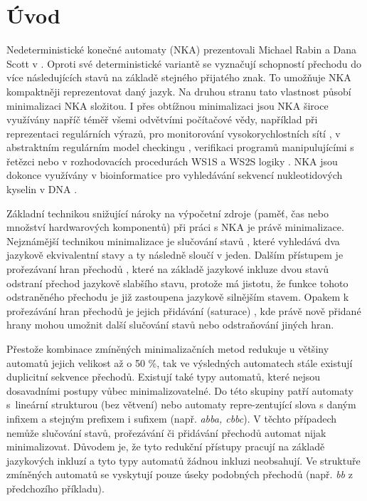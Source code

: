 \section{Úvod}
    Nedeterministické konečné automaty (NKA) prezentovali Michael Rabin a Dana Scott v \cite{FA_and_Their_Decisin_Problems}. Oproti své deterministické variantě se vyznačují schopností přechodu do více následujících stavů na základě stejného přijatého znak. To umožňuje NKA kompaktněji reprezentovat daný jazyk. Na druhou stranu tato vlastnost působí minimalizaci NKA složitou. I přes obtížnou minimalizaci jsou NKA široce využívány napříč téměř všemi odvětvími počítačové vědy, například při reprezentaci regulárních výrazů, pro monitorování vysokorychlostních sítí \cite{FPGA_based_network_scaning}, v abstraktním regulárním model checkingu \cite{ARMC}, verifikaci programů manipulujícími s řetězci \cite{String_constraints_for_ver} nebo v rozhodovacích procedurách WS1S a WS2S logiky \cite{On_equivalence_checking, Nested_antichains_for_WS1S}. NKA jsou dokonce využívány v bioinformatice pro vyhledávání sekvencí nukleotidových kyselin v DNA \cite{DNA_pattern_analysis_using_FA}.

    Základní technikou snižující nároky na výpočetní zdroje (paměť, čas nebo množství hardwarových komponentů) při práci s NKA je právě minimalizace. Nejznámější technikou minimalizace je slučování stavů \cite{Oldest_Merge,Simulation_based_minimization,On_nfa_reduction}, které vyhledává dva jazykově ekvivalentní stavy a ty následně sloučí v jeden. Dalším přístupem je prořezávaní hran přechodů \cite{Simulation_based_minimization, Lorenzo_prunning_saturation}, které na základě jazykové inkluze dvou stavů odstraní přechod jazykově slabšího stavu, protože má jistotu, že funkce tohoto odstraněného přechodu je již zastoupena jazykově silnějším stavem. Opakem k prořezávání hran přechodů je jejich přidávání (saturace) \cite{Oldest_Merge, Lorenzo_prunning_saturation}, kde právě nově přidané hrany mohou umožnit další slučování stavů nebo odstraňování jiných hran.

    Přestože kombinace zmíněných minimalizačních metod redukuje u většiny automatů jejich velikost až o 50 \%, tak ve výsledných automatech stále existují duplicitní sekvence přechodů. Existují také typy automatů, které nejsou dosavadními postupy vůbec minimalizovatelné. Do této skupiny patří automaty s~lineární strukturou (bez větvení) nebo automaty repre-zentující slova s daným infixem a stejným prefixem i sufixem (např. \textit{abba, cbbc}). V těchto případech nemůže slučování stavů, prořezávání či přidávání přechodů automat nijak minimalizovat. Důvodem je, že tyto redukční přístupy pracují na základě jazykových inkluzí a tyto typy automatů žádnou inkluzi neobsahují. Ve struktuře zmíněných automatů se vyskytují pouze úseky podobných přechodů (např. \textit{bb} z předchozího příkladu).

